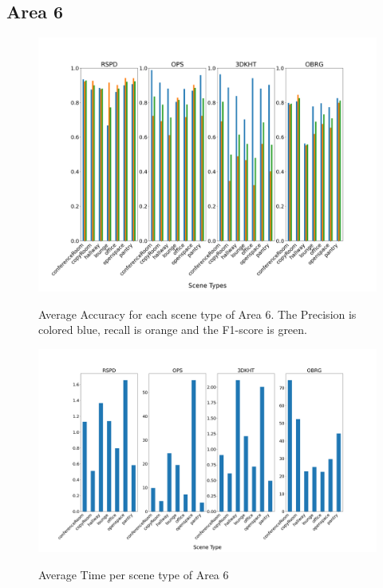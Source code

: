 \documentclass[main.tex]{subfiles}
\begin{document}
\subsection{Area 6}

\begin{figure}[H]
    \centering
    \includegraphics[width=15 cm]{images/area_6_acc.png}
    \label{fig:area6A}
    \caption[Accuracies Area 6]{Average Accuracy for each scene type of Area 6. The Precision
        is colored blue, recall is orange and the F1-score is green. }
\end{figure}


\begin{figure}[H]
    \centering
    \includegraphics[width=15 cm]{images/area_6_time.png}
    \label{fig:area6T}
    \caption[Times Area 6]{Average Time per scene type of Area 6}
\end{figure}
\end{document}

